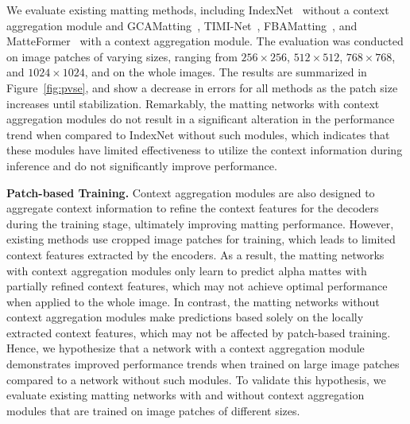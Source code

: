 \documentclass[10pt,twocolumn,letterpaper]{article}
\begin{document}
We evaluate existing matting methods, including IndexNet~\cite{lu2019indices} without a context aggregation module and GCAMatting~\cite{li2020natural}, TIMI-Net~\cite{Liu_2021_ICCV}, FBAMatting~\cite{forte2020fbamatting}, and MatteFormer~\cite{park2022matteformer} with a context aggregation module.
The evaluation was conducted on image patches of varying sizes, ranging from $256 \times 256$, $512 \times 512$, $768 \times 768$, and $1024 \times 1024$, and on the whole images. 
The results are summarized in Figure~\ref{fig:pvse}, and show a decrease in errors for all methods as the patch size increases until stabilization. 
Remarkably, the matting networks with context aggregation modules do not result in a significant alteration in the performance trend when compared to IndexNet without such modules, which indicates that these modules have limited effectiveness to utilize the context information during inference and do not significantly improve performance.


\noindent \textbf{Patch-based Training.}
Context aggregation modules are also designed to aggregate context information to refine the context features for the decoders during the training stage, ultimately improving matting performance. 
However, existing methods use cropped image patches for training, which leads to limited context features extracted by the encoders. 
As a result, the matting networks with context aggregation modules only learn to predict alpha mattes with partially refined context features, which may not achieve optimal performance when applied to the whole image.
In contrast, the matting networks without context aggregation modules make predictions based solely on the locally extracted context features, which may not be affected by patch-based training. 
Hence, we hypothesize that a network with a context aggregation module demonstrates improved performance trends when trained on large image patches compared to a network without such modules. 
To validate this hypothesis, we evaluate existing matting networks with and without context aggregation modules that are trained on image patches of different sizes. 
\end{document}
